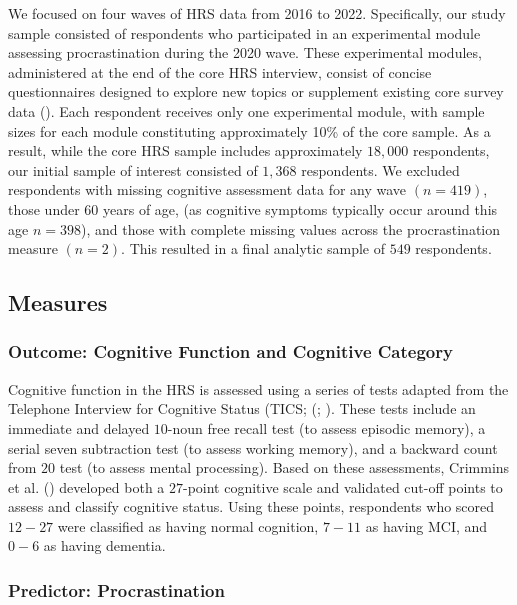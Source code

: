 \documentclass[
]{article}
\begin{document}
We focused on four waves of HRS data from 2016 to 2022. Specifically,
our study sample consisted of respondents who participated in an
experimental module assessing procrastination during the 2020 wave.
These experimental modules, administered at the end of the core HRS
interview, consist of concise questionnaires designed to explore new
topics or supplement existing core survey data
(). Each respondent
receives only one experimental module, with sample sizes for each module
constituting approximately 10\% of the core sample. As a result, while
the core HRS sample includes approximately \(18,000\) respondents, our
initial sample of interest consisted of \(1,368\) respondents. We
excluded respondents with missing cognitive assessment data for any wave
\((n = 419)\), those under 60 years of age, (as cognitive symptoms
typically occur around this age \(n = 398\)), and those with complete
missing values across the procrastination measure \((n = 2)\). This
resulted in a final analytic sample of \(549\) respondents.

\subsection{Measures}\label{measures}

\subsubsection{Outcome: Cognitive Function and Cognitive
Category}\label{outcome-cognitive-function-and-cognitive-category}

Cognitive function in the HRS is assessed using a series of tests
adapted from the Telephone Interview for Cognitive Status (TICS;
(;
). These tests include an
immediate and delayed \(10\)-noun free recall test (to assess episodic
memory), a serial seven subtraction test (to assess working memory), and
a backward count from \(20\) test (to assess mental processing). Based
on these assessments, Crimmins et al.
() developed both a \(27\)-point
cognitive scale and validated cut-off points to assess and classify
cognitive status. Using these points, respondents who scored \(12 - 27\)
were classified as having normal cognition, \(7 - 11\) as having MCI,
and \(0 - 6\) as having dementia.

\subsubsection{Predictor:
Procrastination}\label{predictor-procrastination}
\end{document}
